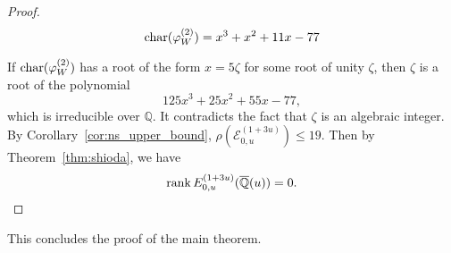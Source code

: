 \documentclass[main]{subfiles}
\begin{document}
\begin{proof}
\begin{equation}
    \operatorname{char}(\varphi_{W}^{(2)}) = x^{3} + x^{2} + 11 x - 77
\end{equation}

If $\operatorname{char} (\varphi_{W}^{(2)})$ has a root of the form $x=5\zeta$ for some root of unity $\zeta$, then $\zeta$ is a root of the polynomial
\begin{equation}
    125x^{3} + 25x^{2} + 55 x - 77,
\end{equation}
which is irreducible over $\mathbb{Q}$.
It contradicts the fact that $\zeta$ is an algebraic integer.
By Corollary~\ref{cor:ns_upper_bound}, $\rho(\mathcal{E}_{0,u}^{(1 + 3u)}) \leq 19$.
Then by Theorem~\ref{thm:shioda}, we have
\begin{equation}
    \operatorname{rank} E_{0,u}^{(1 + 3u)}(\overline{\mathbb{Q}}(u)) = 0.
\end{equation}

\end{proof}

This concludes the proof of the main theorem.
\end{document}

